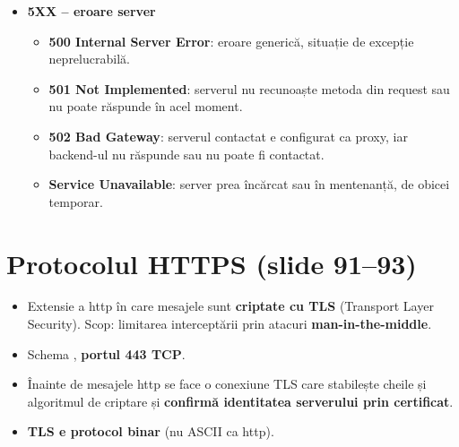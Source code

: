 \documentclass[11pt,a4paper]{article}
\begin{document}
\begin{itemize}
\begin{itemize}
    \item \textbf{407 Proxy Authentication Required}: autentificare validă cerută de un proxy.
    \item \textbf{408 Request Timeout}: serverul nu a răspuns în timp util și clientul nu mai așteaptă.
  \end{itemize}
  \item \textbf{5XX -- eroare server}
  \begin{itemize}
    \item \textbf{500 Internal Server Error}: eroare generică, situație de excepție neprelucrabilă.
    \item \textbf{501 Not Implemented}: serverul nu recunoaște metoda din request sau nu poate răspunde în acel moment.
    \item \textbf{502 Bad Gateway}: serverul contactat e configurat ca proxy, iar backend-ul nu răspunde sau nu poate fi contactat.
    \item \textbf{Service Unavailable}: server prea încărcat sau în mentenanță, de obicei temporar.
  \end{itemize}
\end{itemize}

\section{Protocolul HTTPS (slide 91--93)}
\begin{itemize}
  \item Extensie a http în care mesajele sunt \textbf{criptate cu TLS} (Transport Layer Security). Scop: limitarea interceptării prin atacuri \textbf{man-in-the-middle}.
  \item Schema , \textbf{portul 443 TCP}.
  \item Înainte de mesajele http se face o conexiune TLS care stabilește cheile și algoritmul de criptare și \textbf{confirmă identitatea serverului prin certificat}.
  \item \textbf{TLS e protocol binar} (nu ASCII ca http).
\end{itemize}
\end{document}
